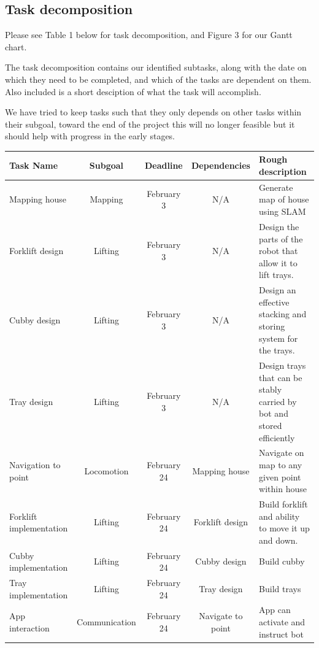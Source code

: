 \documentclass{article}
\begin{document}
\subsection{Task decomposition} 
Please see Table 1 below for task decomposition, and Figure 3 for our Gantt chart. 

The task decomposition contains our identified subtasks, along with the date on which they need to be completed, and which of the tasks are dependent on them. Also included is a short desciption of what the task will accomplish. 

We have tried to keep tasks such that they only depends on other tasks within their subgoal, toward the end of the project this will no longer feasible but it should help with progress in the early stages. 

\begin{table}[h]
\vskip 3mm
\begin{center}
\begin{small}
\begin{sc}
\begin{tabular}{lcccp{3cm}}
\hline
\abovespace\belowspace
Task Name & Subgoal  & Deadline & Dependencies &  Rough description \\
\hline
\hline
\abovespace
Mapping house & Mapping & February 3 & N/A & Generate map of house using SLAM \\ \hline
Forklift design & Lifting & February 3 & N/A & Design the parts of the robot that allow it to lift trays. \\ \hline
Cubby design & Lifting & February 3 & N/A & Design an effective stacking and storing system for the trays. \\ \hline
Tray design & Lifting & February 3 & N/A & Design trays that can be stably carried by bot and stored efficiently \\ \hline
Navigation to point & Locomotion & February 24 & Mapping house & Navigate on map to any given point within house \\ \hline
Forklift implementation & Lifting & February 24 & Forklift design & Build forklift and ability to move it up and down. \\ \hline
Cubby implementation & Lifting & February 24 & Cubby design & Build cubby \\ \hline
Tray implementation & Lifting & February 24 & Tray design & Build trays \\ \hline
App interaction & Communication & February 24 & Navigate to point & App can activate and instruct bot \\ \hline

\end{tabular}
\end{sc}
\end{small}
\end{center}
\end{table}
\end{document}
